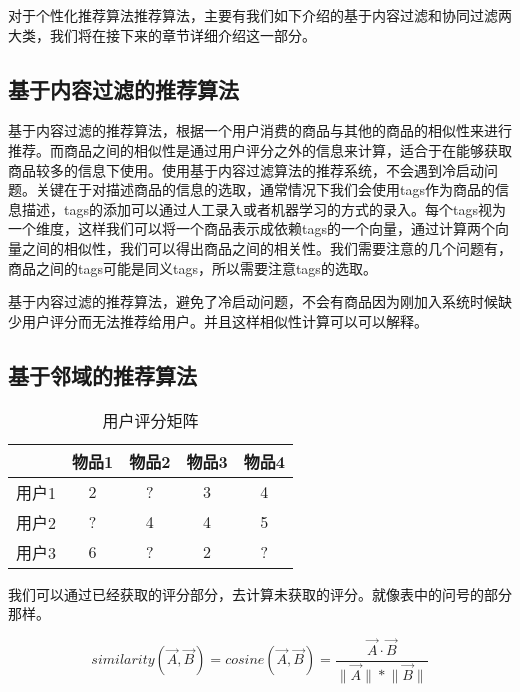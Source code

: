 对于个性化推荐算法推荐算法，主要有我们如下介绍的基于内容过滤和协同过滤两大类，我们将在接下来的章节详细介绍这一部分。

\subsection{基于内容过滤的推荐算法}
基于内容过滤的推荐算法，根据一个用户消费的商品与其他的商品的相似性来进行推荐。而商品之间的相似性是通过用户评分之外的信息来计算，适合于在能够获取商品较多的信息下使用。使用基于内容过滤算法的推荐系统，不会遇到冷启动问题。关键在于对描述商品的信息的选取，通常情况下我们会使用tags作为商品的信息描述，tags的添加可以通过人工录入或者机器学习的方式的录入。每个tags视为一个维度，这样我们可以将一个商品表示成依赖tags的一个向量，通过计算两个向量之间的相似性，我们可以得出商品之间的相关性。我们需要注意的几个问题有，商品之间的tags可能是同义tags，所以需要注意tags的选取。

基于内容过滤的推荐算法，避免了冷启动问题，不会有商品因为刚加入系统时候缺少用户评分而无法推荐给用户。并且这样相似性计算可以可以解释。

\subsection{基于邻域的推荐算法}
    \begin{table*}[htbp]
    \centering
    \caption{用户评分矩阵}
    \begin{tabular}{|c|c|c|c|c|}
        \hline
        & 物品1 & 物品2 & 物品3 & 物品4 \\ \hline
        用户1 & 2& ? & 3 & 4\\ \hline
        用户2 & ? &4 &  4 & 5\\ \hline
        用户3 & 6 & ?& 2 & ? \\ \hline
    \end{tabular}
    \end{table*}
    我们可以通过已经获取的评分部分，去计算未获取的评分。就像表中的问号的部分那样。

    \begin{equation}
       similarity(\vec{A}, \vec{B}) = cosine(\vec{A}, \vec{B}) = \frac{\vec{A} \cdot \vec{B}}{\lVert\vec{A}\rVert\ast\lVert\vec{B}\rVert}
    \end{equation}

